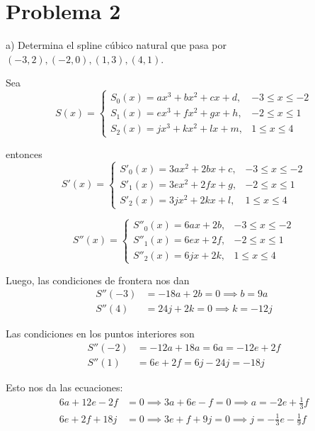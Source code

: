 \documentclass[11pt, oneside]{article}
\begin{document}
\newpage

\section*{Problema 2}

a) Determina el spline cúbico natural que pasa por $(-3, 2), (-2, 0), (1, 3), (4, 1)$.

Sea
\[ S(x) = \begin{cases} S_0(x) = ax^3 + bx^2 + cx + d, & -3 \le x \le -2 \\ S_1(x) = ex^3 + fx^2 + gx + h, & -2 \le x \le 1 \\ S_2(x) = jx^3 + kx^2 + lx + m, & 1 \le x \le 4 \end{cases} \]

entonces
\[ S'(x) = \begin{cases} S'_0(x) = 3ax^2 + 2bx + c, & -3 \le x \le -2 \\ S'_1(x) = 3ex^2 + 2fx + g, & -2 \le x \le 1 \\ S'_2(x) = 3jx^2 + 2kx + l, & 1 \le x \le 4 \end{cases} \]

\[ S''(x) = \begin{cases} S''_0(x) = 6ax + 2b, & -3 \le x \le -2 \\ S''_1(x) = 6ex + 2f, & -2 \le x \le 1 \\ S''_2(x) = 6jx + 2k, & 1 \le x \le 4 \end{cases} \]

Luego, las condiciones de frontera nos dan
\begin{align*}
    S''(-3) &= -18a + 2b = 0 \implies b = 9a \\
    S''(4) &= 24j + 2k = 0 \implies k = -12j
\end{align*}

Las condiciones en los puntos interiores son
\begin{align*}
    S''(-2) &= -12a + 18a = 6a = -12e + 2f \\
    S''(1) &= 6e + 2f = 6j - 24j = -18j
\end{align*}

Esto nos da las ecuaciones:
\begin{align*}
    6a + 12e - 2f &= 0 \implies 3a + 6e - f = 0 \implies a = -2e + \frac{1}{3}f \\
    6e + 2f + 18j &= 0 \implies 3e + f + 9j = 0 \implies j = -\frac{1}{3}e - \frac{1}{9}f
\end{align*}

\newpage
\end{document}
